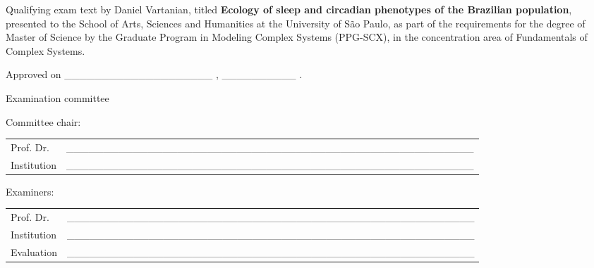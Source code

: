 \begin{folhadeaprovacao}
  \noindent
Qualifying exam text by Daniel Vartanian, titled \textbf{Ecology of
sleep and circadian phenotypes of the Brazilian population}, presented
to the School of Arts, Sciences and Humanities at the University of São
Paulo, as part of the requirements for the degree of Master of Science
by the Graduate Program in Modeling Complex Systems (PPG-SCX), in the
concentration area of Fundamentals of Complex Systems.

  \vspace*{1.5cm}

  \noindent
  Approved on \_\_\_\_\_\_\_\_\_\_\_\_\_\_\_\_\_\_\_\_ , \_\_\_\_\_\_\_\_\_\_ .

  \vspace*{1.5cm}

  \begin{center}
    \noindent Examination committee
  \end{center}

  \vspace*{0.5cm}

  \noindent Committee chair:

  \vspace*{0.25cm}

  \renewcommand{\arraystretch}{2}
  \setlength{\arrayrulewidth}{0pt}
  \setlength{\tabcolsep}{0pt}
  \noindent
  \begin{tabular}{m{2cm} P{14cm}}
    Prof. Dr. & \_\_\_\_\_\_\_\_\_\_\_\_\_\_\_\_\_\_\_\_\_\_\_\_\_\_\_\_\_\_\_\_\_\_\_\_\_\_\_\_\_\_\_\_\_\_\_\_\_\_\_\_\_\_\_ \\
    Institution & \_\_\_\_\_\_\_\_\_\_\_\_\_\_\_\_\_\_\_\_\_\_\_\_\_\_\_\_\_\_\_\_\_\_\_\_\_\_\_\_\_\_\_\_\_\_\_\_\_\_\_\_\_\_\_ \\
  \end{tabular}

  \vspace*{1cm}

  \noindent Examiners:

  \vspace*{0.25cm}

  \noindent
  \begin{tabular}{m{2cm} P{14cm}}
    Prof. Dr. & \_\_\_\_\_\_\_\_\_\_\_\_\_\_\_\_\_\_\_\_\_\_\_\_\_\_\_\_\_\_\_\_\_\_\_\_\_\_\_\_\_\_\_\_\_\_\_\_\_\_\_\_\_\_\_ \\
    Institution & \_\_\_\_\_\_\_\_\_\_\_\_\_\_\_\_\_\_\_\_\_\_\_\_\_\_\_\_\_\_\_\_\_\_\_\_\_\_\_\_\_\_\_\_\_\_\_\_\_\_\_\_\_\_\_ \\
    Evaluation & \_\_\_\_\_\_\_\_\_\_\_\_\_\_\_\_\_\_\_\_\_\_\_\_\_\_\_\_\_\_\_\_\_\_\_\_\_\_\_\_\_\_\_\_\_\_\_\_\_\_\_\_\_\_\_ \\
  \end{tabular}


\end{folhadeaprovacao}
